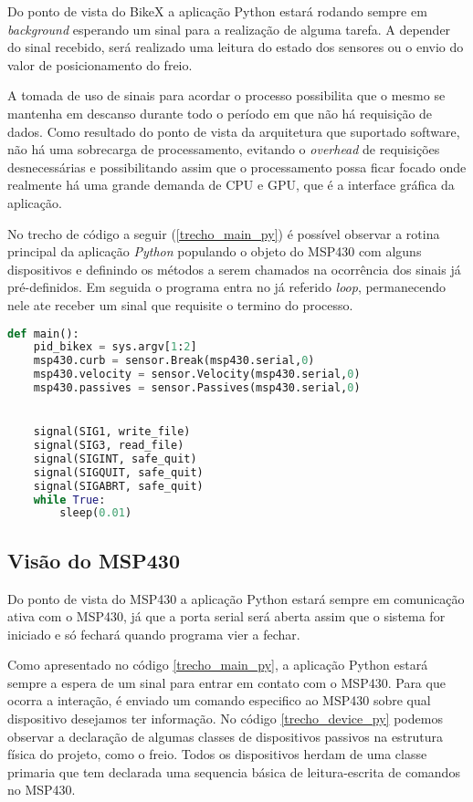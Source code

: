 Do ponto de vista do BikeX a aplicação Python estará rodando sempre em \textit{background} esperando um sinal para a realização de alguma tarefa. A depender do sinal recebido, será realizado uma leitura do estado dos sensores ou o envio do valor de posicionamento do freio.

A tomada de uso de sinais para acordar o processo possibilita que o mesmo se mantenha em descanso durante todo o período em que não há requisição de dados. Como resultado do ponto de vista da arquitetura que suportado software, não há uma sobrecarga de processamento, evitando o \textit{overhead} de requisições desnecessárias e possibilitando assim que o processamento possa ficar focado onde realmente há uma grande demanda de CPU e GPU, que é a interface gráfica da aplicação.

No trecho de código a seguir (\ref{trecho_main_py}) é possível observar a rotina principal da aplicação \textit{Python} populando o objeto do MSP430 com alguns dispositivos e definindo os métodos a serem chamados na ocorrência dos sinais já pré-definidos. Em seguida o programa entra no já referido \textit{loop}, permanecendo nele ate receber um sinal que requisite o termino do processo.

\begin{lstlisting}[language=Python,caption={Trecho da rotina principal do script Python},label=trecho_main_py]
def main():
    pid_bikex = sys.argv[1:2]
    msp430.curb = sensor.Break(msp430.serial,0)
    msp430.velocity = sensor.Velocity(msp430.serial,0)
    msp430.passives = sensor.Passives(msp430.serial,0)


    signal(SIG1, write_file)
    signal(SIG3, read_file)
    signal(SIGINT, safe_quit)
    signal(SIGQUIT, safe_quit)
    signal(SIGABRT, safe_quit)
    while True:
        sleep(0.01)

\end{lstlisting}


\subsection{Visão do MSP430} %
\label{sub:vis_o_do_msp430}

Do ponto de vista do MSP430 a aplicação Python estará sempre em comunicação ativa com o MSP430, já que a porta serial será aberta assim que o sistema for iniciado e só fechará quando programa vier a fechar.

Como apresentado no código \ref{trecho_main_py}, a aplicação Python estará sempre a espera de um sinal para entrar em contato com o MSP430. Para que ocorra a interação, é enviado um comando especifico ao MSP430 sobre qual dispositivo desejamos ter informação. No código \ref{trecho_device_py} podemos observar a declaração de algumas classes de dispositivos passivos na estrutura física do projeto, como o freio. Todos os dispositivos herdam de uma classe primaria que tem declarada uma sequencia básica de leitura-escrita de comandos no MSP430.


